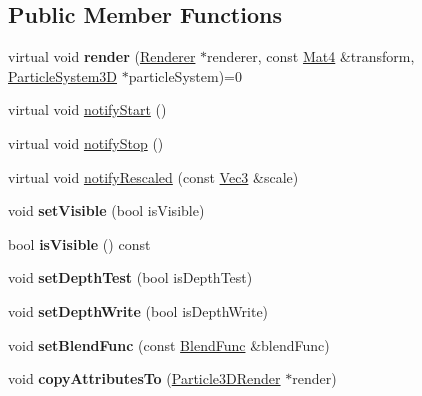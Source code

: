 \subsection*{Public Member Functions}
\begin{DoxyCompactItemize}
\item 
\mbox{\label{classParticle3DRender_a9269459c14917229ae212ecca5d84e89}} 
virtual void {\bfseries render} (\hyperlink{classRenderer}{Renderer} $\ast$renderer, const \hyperlink{classMat4}{Mat4} \&transform, \hyperlink{classParticleSystem3D}{Particle\+System3D} $\ast$particle\+System)=0
\item 
virtual void \hyperlink{classParticle3DRender_a77140f54f79cfbfc851e044d9a1c70ba}{notify\+Start} ()
\item 
virtual void \hyperlink{classParticle3DRender_a69d51309d5bf42bf947a4601fc9d1afe}{notify\+Stop} ()
\item 
virtual void \hyperlink{classParticle3DRender_a47e83d2bfea30ffbbaff7ff6526f5047}{notify\+Rescaled} (const \hyperlink{classVec3}{Vec3} \&scale)
\item 
\mbox{\label{classParticle3DRender_a6c8ec8edf2766b4dd45baedec7d284d2}} 
void {\bfseries set\+Visible} (bool is\+Visible)
\item 
\mbox{\label{classParticle3DRender_ac92778a2a9bcf26e85fddbe71fdf3db5}} 
bool {\bfseries is\+Visible} () const
\item 
\mbox{\label{classParticle3DRender_a72df0452fb9fae7d3f27f75570a427ce}} 
void {\bfseries set\+Depth\+Test} (bool is\+Depth\+Test)
\item 
\mbox{\label{classParticle3DRender_ad9ee8ff527b267fc8f54a5afe90e049a}} 
void {\bfseries set\+Depth\+Write} (bool is\+Depth\+Write)
\item 
\mbox{\label{classParticle3DRender_a49b7cbcad64a40ddec0508a1b7ed3f7a}} 
void {\bfseries set\+Blend\+Func} (const \hyperlink{structBlendFunc}{Blend\+Func} \&blend\+Func)
\item 
\mbox{\label{classParticle3DRender_a8463dcf17d5a05ac2a81df7978dbc52b}} 
void {\bfseries copy\+Attributes\+To} (\hyperlink{classParticle3DRender}{Particle3\+D\+Render} $\ast$render)

\end{DoxyCompactItemize}
